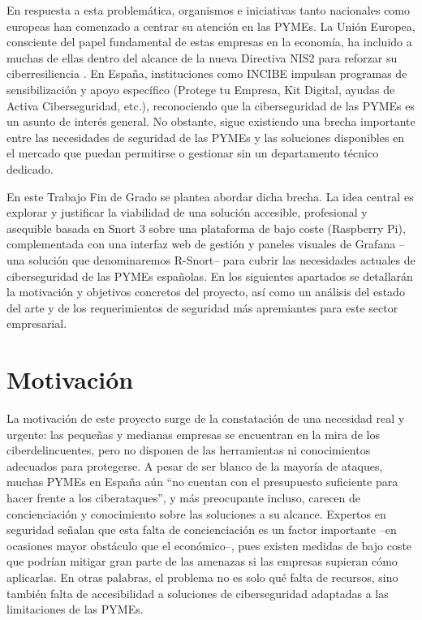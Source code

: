 \documentclass[11pt,a4paper,twoside]{report}
\begin{document}
En respuesta a esta problemática, organismos e iniciativas tanto nacionales como europeas han comenzado a centrar su atención en las PYMEs. La Unión Europea, consciente del papel fundamental de estas empresas en la economía, ha incluido a muchas de ellas dentro del alcance de la nueva Directiva NIS2 para reforzar su ciberresiliencia \cite{incibe2025}. En España, instituciones como INCIBE impulsan programas de sensibilización y apoyo específico (Protege tu Empresa, Kit Digital, ayudas de Activa Ciberseguridad, etc.), reconociendo que la ciberseguridad de las PYMEs es un asunto de interés general. No obstante, sigue existiendo una brecha importante entre las necesidades de seguridad de las PYMEs y las soluciones disponibles en el mercado que puedan permitirse o gestionar sin un departamento técnico dedicado.\newline

En este Trabajo Fin de Grado se plantea abordar dicha brecha. La idea central es explorar y justificar la viabilidad de una solución accesible, profesional y asequible basada en Snort 3 sobre una plataforma de bajo coste (Raspberry Pi), complementada con una interfaz web de gestión y paneles visuales de Grafana –una solución que denominaremos R-Snort– para cubrir las necesidades actuales de ciberseguridad de las PYMEs españolas. En los siguientes apartados se detallarán la motivación y objetivos concretos del proyecto, así como un análisis del estado del arte y de los requerimientos de seguridad más apremiantes para este sector empresarial.

\section{Motivación}

La motivación de este proyecto surge de la constatación de una necesidad real y urgente: las pequeñas y medianas empresas se encuentran en la mira de los ciberdelincuentes, pero no disponen de las herramientas ni conocimientos adecuados para protegerse. A pesar de ser blanco de la mayoría de ataques, muchas PYMEs en España aún “no cuentan con el presupuesto suficiente para hacer frente a los ciberataques”, y más preocupante incluso, carecen de concienciación y conocimiento sobre las soluciones a su alcance. Expertos en seguridad señalan que esta falta de concienciación es un factor importante –en ocasiones mayor obstáculo que el económico–, pues existen medidas de bajo coste que podrían mitigar gran parte de las amenazas si las empresas supieran cómo aplicarlas. En otras palabras, el problema no es solo qué falta de recursos, sino también falta de accesibilidad a soluciones de ciberseguridad adaptadas a las limitaciones de las PYMEs.\newline
\end{document}
